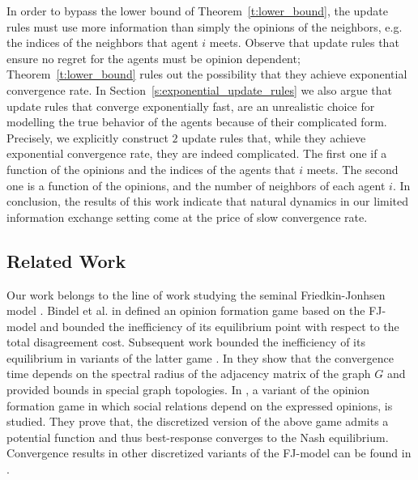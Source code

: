 In order to bypass the lower bound of Theorem~\ref{t:lower_bound},
the update rules must use more information than simply the opinions
of the neighbors, e.g. the indices of the neighbors that agent $i$ meets.
Observe that update rules that ensure no regret for the agents must be opinion
dependent; Theorem~\ref{t:lower_bound} rules out the possibility
that they achieve exponential convergence rate.
In Section~\ref{s:exponential_update_rules} we also argue that
update rules that converge exponentially fast,
are an unrealistic choice for modelling the true behavior of
the agents because of their complicated form.
Precisely, we explicitly construct $2$ update rules that, while they
achieve exponential convergence rate, they are indeed complicated.
The first one if a function of the opinions and the indices of
the agents that $i$ meets. The second one is a function of
the opinions, and the number of neighbors of each agent $i$.
In conclusion, the results of this work indicate that
natural dynamics in our limited information exchange setting
come at the price of slow convergence rate.







\subsection{Related Work}
Our work belongs to the line of work studying the seminal Friedkin-Jonhsen
model \cite{FJ90}. Bindel et al. in \cite{BKO11} defined an opinion
formation game based on the FJ-model and bounded the inefficiency
of its equilibrium point with respect to the total disagreement cost.
Subsequent work bounded the inefficiency of its equilibrium in variants
of the latter game \cite{BGM13, EFHS17, CKO13, BFM16}.
In \cite{GS14} they show that the convergence time depends on
the spectral radius of the adjacency matrix of the graph $G$
and provided bounds in special graph topologies.
In \cite{BFM16}, a variant of the opinion formation game in which social
relations depend on the expressed opinions, is studied.
They prove that, the discretized version of the above game admits
a potential function and thus best-response converges to the
Nash equilibrium. Convergence results in other discretized variants of
the FJ-model can be found in \cite{YOASS13, FGV16}.


